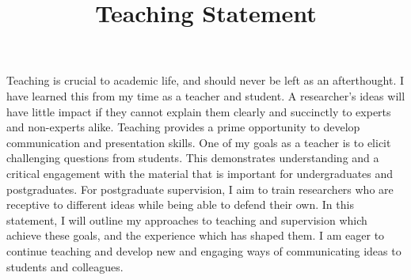 \documentclass[12pt]{article}
\title{Teaching Statement}
\date{}
\author{}
\begin{document}
\maketitle
\thispagestyle{empty}


Teaching is crucial to academic life, and should never be left as an afterthought.
%
I have learned this from my time as a teacher and student.
%
A researcher's ideas will have little impact if they cannot explain them clearly and succinctly to experts and non-experts alike.
%
Teaching provides a prime opportunity to develop communication and presentation skills.
%
One of my goals as a teacher is to elicit challenging questions from students.
%
This demonstrates understanding and a critical engagement with the material that is important for undergraduates and postgraduates.
%
For postgraduate supervision, I aim to train researchers who are receptive to different ideas while being able to defend their own.
%
In this statement, I will outline my approaches to teaching and supervision which achieve these goals, and the experience which has shaped them.
%
I am eager to continue teaching and develop new and engaging ways of communicating ideas to students and colleagues.

\iffalse
Teaching is essential to academic life and should never be dismissed as an afterthought.
%
Academics cannot succeed without the ability to clearly, succinctly explain their ideas.
%
In particular, they should be able to communicate with non-experts; teaching provides the perfect opportunity to develop this skill.
%
%
Teaching should be engaging and stimulating for students.

I'm early in my teaching career, but look forward to developing interesting and entertaining teaching methods through an active dialogue with students.

From my experience teaching, and as a student, I've found that grounding content into practical real-world examples, providing hands on work, and covering state-of-the-art methods and ideas are key ways to achieve this.
%
An indicator of a teacher's success is the questions they receive from students.
% 
If a teacher receives novel, challenging questions, the students have understood the material and are engaging with it critically.
%
This should be the ultimate goal of teaching, and is what I aim for.
%
This is particularly applicable to postgraduates, who we should teach to view the world with a critical eye and develop original ideas.
\fi
\end{document}
